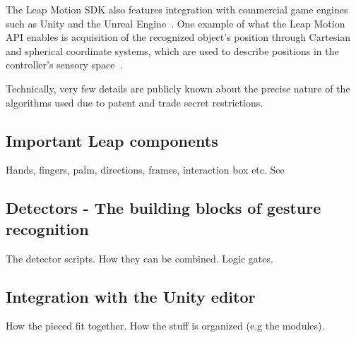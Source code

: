 The Leap Motion SDK also features integration with commercial game engines such as Unity and the Unreal Engine~\citep{Guna2014}. One example of what the Leap Motion API enables is acquisition of the recognized object's position through Cartesian and spherical coordinate systems, which are used to describe positions in the controller's sensory space~\citep{Guna2014}.  

Technically, very few details are publicly known about the precise nature of the algorithms used due to patent and trade secret restrictions.

\subsection{Important Leap components}
Hands, fingers, palm, directions, frames, interaction box etc. See \\


\subsection{Detectors - The building blocks of gesture recognition}
The detector scripts. How they can be combined. Logic gates. 

\subsection{Integration with the Unity editor}
How the pieced fit together. How the stuff is organized (e.g the modules).
